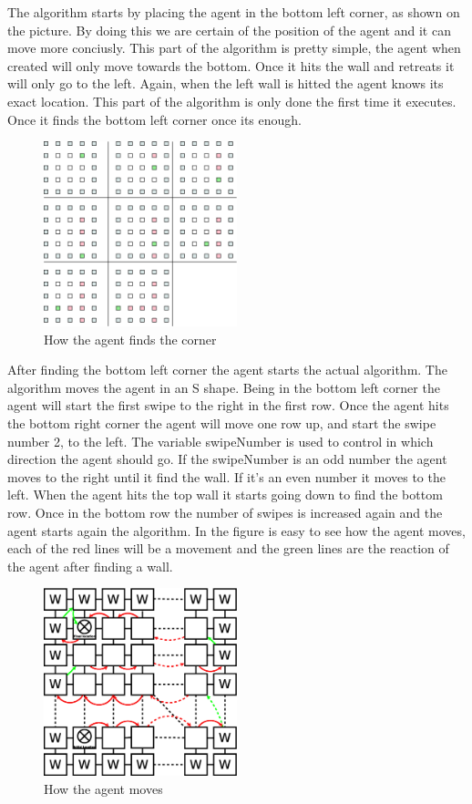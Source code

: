 	The algorithm starts by placing the agent in the bottom left corner, as shown on the picture. 
	By doing this we are certain of the position of the agent and it can move more conciusly.
	This part of the algorithm is pretty simple, the agent when created will only move towards the bottom.
	Once it hits the wall and retreats it will only go to the left.
	Again, when the left wall is hitted the agent knows its exact location.
	This part of the algorithm is only done the first time it executes.
	Once it finds the bottom left corner once its enough.

\begin{figure}[h] \label{fig:corner}	\centering
\includegraphics[width=0.5\textwidth]{find_corner}
\caption{How the agent finds the corner}
\end{figure}

After finding the bottom left corner the agent starts the actual algorithm. The
algorithm moves the agent in an S shape. Being in the bottom left corner the
agent will start the first swipe to the right in the first row.	Once the agent
hits the bottom right corner the agent will move one row up, and start the swipe
number 2, to the left.	The variable swipeNumber is used to control in which
direction the agent should go.	If the swipeNumber is an odd number the agent
moves to the right until it find the wall. If it's an even number it moves to
the left.	When the agent hits the top wall it starts going down to find the
bottom row.	Once in the bottom row the number of swipes is increased again and
the agent starts again the algorithm.	In the figure is easy to see how the agent
moves, each of the red lines will be a movement and the green lines are the
reaction of the agent after finding a wall.


\begin{figure}[h]\label{fig:simpleAlgorithm} \centering
\includegraphics[width=0.5\textwidth]{SimpleAlgorithm}
\caption{How the agent moves}
\end{figure}



